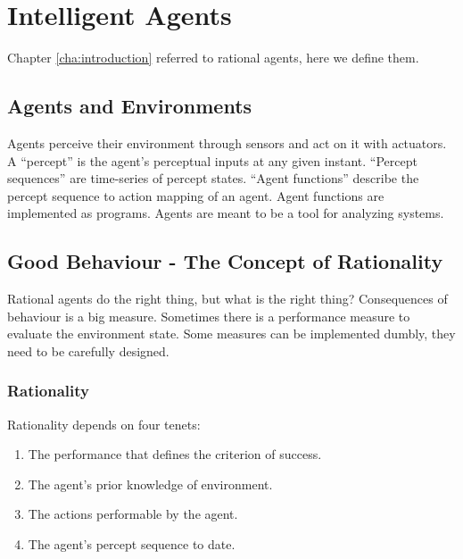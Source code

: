 \chapter{Intelligent Agents} %
\label{cha:intelligent_agents}

Chapter \ref{cha:introduction} referred to rational agents, here we define them.

\section{Agents and Environments} %
\label{sec:agents_and_environments}

Agents perceive their environment through sensors and act on it with actuators.
A ``percept'' is the agent's perceptual inputs at any given instant.
``Percept sequences'' are time-series of percept states.
``Agent functions'' describe the percept sequence to action mapping of an agent.
Agent functions are implemented as programs.
Agents are meant to be a tool for analyzing systems.


\section{Good Behaviour - The Concept of Rationality} %
\label{sec:good_behaviour_the_concept_of_rationality}

Rational agents do the right thing, but what is the right thing?
Consequences of behaviour is a big measure.
Sometimes there is a performance measure to evaluate the environment state.
Some measures can be implemented dumbly, they need to be carefully designed.

\subsection{Rationality} %
\label{sub:rationality}
Rationality depends on four tenets:
\begin{enumerate}
    \item The performance that defines the criterion of success.
    \item The agent's prior knowledge of environment.
    \item The actions performable by the agent.
    \item The agent's percept sequence to date.
\end{enumerate}

